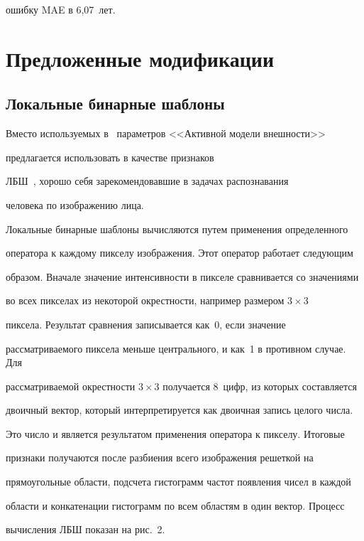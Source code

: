 ошибку MAE в 6,07~лет.



\section{Предложенные модификации}



\subsection{Локальные бинарные шаблоны}



Вместо используемых в~\cite{5-r} параметров <<Активной модели внешности>>

предлагается использовать в качестве признаков

ЛБШ~\cite{16-r}, хорошо себя зарекомендовавшие в задачах распознавания

человека по изображению лица.



Локальные бинарные шаблоны вычисляются путем применения определенного

оператора к каждому пикселу изображения. Этот оператор работает следующим

образом. Вначале значение интенсивности в пикселе сравнивается со значениями

во всех пикселах из некоторой окрестности, например размером $3\times 3$

пиксела. Результат сравнения записывается как~0, если значение

рас\-смат\-ри\-ва\-емо\-го пиксела меньше центрального, и как~1 в противном случае. Для

рассматриваемой окрестности $3 \times 3$ получается 8~цифр, из которых составляется

двоичный вектор, который интерпретируется как двоичная запись целого числа.

Это число и является результатом применения оператора к пикселу. Итоговые

признаки получаются после разбиения всего изображения решеткой на

прямоугольные области, подсчета гистограмм частот появления чисел в каждой

области и конкатенации гистограмм по всем областям в один вектор. Процесс

вычисления ЛБШ показан на рис.~2.



